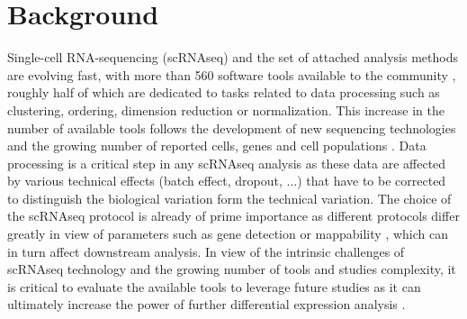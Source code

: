 \documentclass{bmcart}
\begin{document}


\section*{Background}

Single-cell RNA-sequencing (scRNAseq) and the set of attached analysis methods are evolving fast, with more than 560 software tools available to the community \cite{ZappiaDB2018}, roughly half of which are dedicated to tasks related to data processing such as clustering, ordering, dimension reduction or normalization. This increase in the number of available tools follows the development of new sequencing technologies and the growing number of reported cells, genes and cell populations \cite{SvenssonDB2019}. Data processing is a critical step in any scRNAseq analysis as these data are affected by various technical effects (batch effect, dropout, ...) that have to be corrected to distinguish the biological variation form the technical variation. The choice of the scRNAseq protocol is already of prime importance as different protocols differ greatly in view of parameters such as gene detection or mappability \cite{MereuCellAtlas2019}, which can in turn affect downstream analysis. In view of the intrinsic challenges of scRNAseq technology and the growing number of tools and studies complexity, it is critical to evaluate the available tools to leverage future studies as it can ultimately increase the power of further differential expression analysis \cite{viethSystematic2019}.
\end{document}
